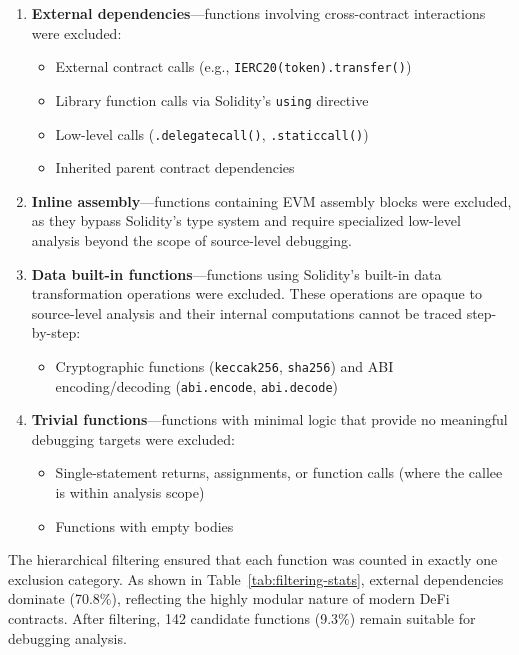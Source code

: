 \documentclass[pdflatex,sn-basic]{sn-jnl}%
\theoremstyle{thmstyleone}%
\theoremstyle{thmstyletwo}%
\theoremstyle{thmstylethree}%
\begin{document}
\begin{enumerate}
  \item \textbf{External dependencies}---functions involving cross-contract interactions were excluded:
    \begin{itemize}
      \item External contract calls (e.g., \texttt{IERC20(token).transfer()})
      \item Library function calls via Solidity's \texttt{using} directive
      \item Low-level calls (\texttt{.delegatecall()}, \texttt{.staticcall()})
      \item Inherited parent contract dependencies
    \end{itemize}

  \item \textbf{Inline assembly}---functions containing EVM assembly blocks were excluded, as they bypass Solidity's type system and require specialized low-level analysis beyond the scope of source-level debugging.

  \item \textbf{Data built-in functions}---functions using Solidity's built-in data transformation operations were excluded. These operations are opaque to source-level analysis and their internal computations cannot be traced step-by-step:
    \begin{itemize}
      \item Cryptographic functions (\texttt{keccak256}, \texttt{sha256}) and ABI encoding/decoding (\texttt{abi.encode}, \texttt{abi.decode})
    \end{itemize}

  \item \textbf{Trivial functions}---functions with minimal logic that provide no meaningful debugging targets were excluded:
    \begin{itemize}
      \item Single-statement returns, assignments, or function calls (where the callee is within analysis scope)
      \item Functions with empty bodies
    \end{itemize}
\end{enumerate}

\noindent The hierarchical filtering ensured that each function was counted in exactly one exclusion category. As shown in Table~\ref{tab:filtering-stats}, external dependencies dominate (70.8\%), reflecting the highly modular nature of modern DeFi contracts. After filtering, 142 candidate functions (9.3\%) remain suitable for debugging analysis.
\end{document}
